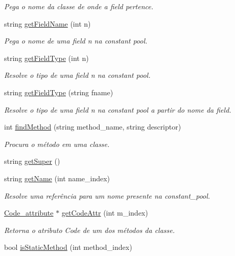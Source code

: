 \begin{DoxyCompactItemize}
\begin{DoxyCompactList}\small\item\em Pega o nome da classe de onde a field pertence. \end{DoxyCompactList}\item 
string \hyperlink{classClassFile_aa502c698d9ba9e511d59b7667c4c7f20}{get\+Field\+Name} (int n)
\begin{DoxyCompactList}\small\item\em Pega o nome de uma field n na constant pool. \end{DoxyCompactList}\item 
string \hyperlink{classClassFile_a6ad7cafd53e2847bd29893ef197f16f2}{get\+Field\+Type} (int n)
\begin{DoxyCompactList}\small\item\em Resolve o tipo de uma field n na constant pool. \end{DoxyCompactList}\item 
string \hyperlink{classClassFile_a87ec0023567d146ba4569016d1247e86}{get\+Field\+Type} (string fname)
\begin{DoxyCompactList}\small\item\em Resolve o tipo de uma field n na constant pool a partir do nome da field. \end{DoxyCompactList}\item 
int \hyperlink{classClassFile_a6287b244d8c558716150cb3bd799af6f}{find\+Method} (string method\+\_\+name, string descriptor)
\begin{DoxyCompactList}\small\item\em Procura o método em uma classe. \end{DoxyCompactList}\item 
string \hyperlink{classClassFile_a140efaffe0358589f5b40e13c5ef807c}{get\+Super} ()
\item 
string \hyperlink{classClassFile_a597f16f2884e82ac447d079c6ae3ce76}{get\+Name} (int name\+\_\+index)
\begin{DoxyCompactList}\small\item\em Resolve uma referência para um nome presente na constant\+\_\+pool. \end{DoxyCompactList}\item 
\hyperlink{attributes_8hpp_ad1d2692bc09d9023430faad186e7647e}{Code\+\_\+attribute} $\ast$ \hyperlink{classClassFile_a44dc4dbf9a22d416a9c0b8a55c997523}{get\+Code\+Attr} (int m\+\_\+index)
\begin{DoxyCompactList}\small\item\em Retorna o atributo Code de um dos métodos da classe. \end{DoxyCompactList}\item 
bool \hyperlink{classClassFile_af4cd0b727cd13354028f1c9d02a53519}{is\+Static\+Method} (int method\+\_\+index)
\end{DoxyCompactItemize}
